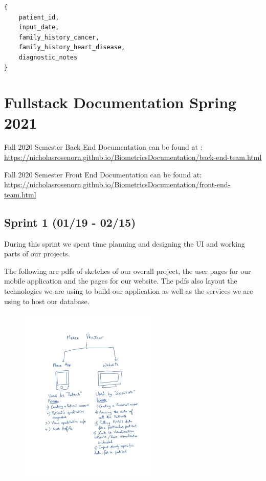 \documentclass[]{book}
\begin{document}
\begin{verbatim}
{
    patient_id,
    input_date,
    family_history_cancer,
    family_history_heart_disease,
    diagnostic_notes
}
\end{verbatim}

\chapter{Fullstack Documentation Spring
2021}\label{fullstack-documentation-spring-2021}

Fall 2020 Semester Back End Documentation can be found at :
\url{https://nicholasrosenorn.github.io/BiometricsDocumentation/back-end-team.html}

Fall 2020 Semester Front End Documentation can be found at:
\url{https://nicholasrosenorn.github.io/BiometricsDocumentation/front-end-team.html}

\section{Sprint 1 (01/19 - 02/15)}\label{sprint-1-0119---0215}

During this sprint we spent time planning and designing the UI and
working parts of our projects.

The following are pdfs of sketches of our overall project, the user
pages for our mobile application and the pages for our website. The pdfs
also layout the technologies we are using to build our application as
well as the services we are using to host our database.

\begin{figure}
\centering
\includegraphics{images/project_overview.png}
\caption{}
\end{figure}
\end{document}
